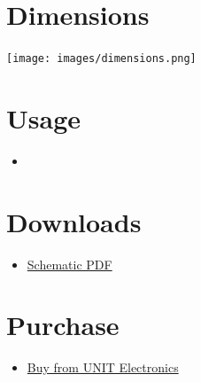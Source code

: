 \documentclass[10pt]{article}
\begin{document}
\section*{Dimensions}
\vspace{1em}
\begin{center}
\texttt{[image: images/dimensions.png]}
\end{center}



\section*{Usage}
\begin{itemize}
\item 
\end{itemize}

\section*{Downloads}
\begin{itemize}
\begin{itemize}
\item \href{docs/schematic.pdf}{Schematic PDF}
\end{itemize}
\end{itemize}

\section*{Purchase}
\begin{itemize}
\item \href{https://www.uelectronics.com}{Buy from UNIT Electronics}
\end{itemize}
\end{document}
